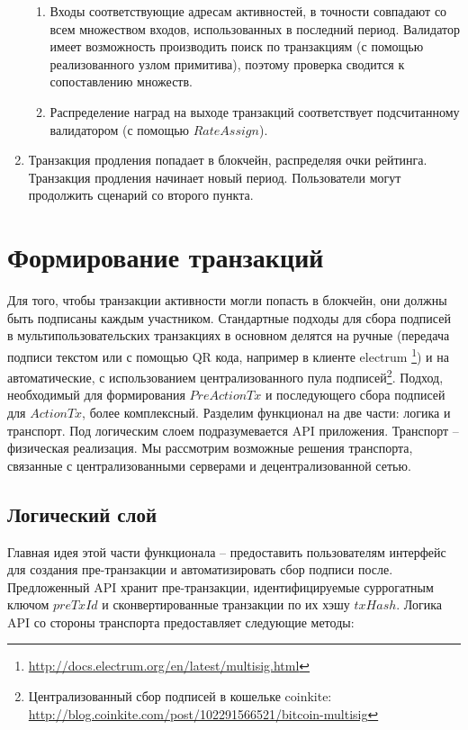 \documentclass[specification,annotation]{itmo-student-thesis}
\begin{document}
\begin{enumerate}
\begin{enumerate}
  \item Входы соответствующие адресам активностей, в точности
    совпадают со всем множеством входов, использованных в последний
    период. Валидатор имеет возможность производить поиск по
    транзакциям (с помощью реализованного узлом примитива), поэтому
    проверка сводится к сопоставлению множеств.
  \item Распределение наград на выходе транзакций соответствует
    подсчитанному валидатором (с помощью $RateAssign$).
  \end{enumerate}
\item Транзакция продления попадает в блокчейн, распределяя очки
  рейтинга. Транзакция продления начинает новый период. Пользователи
  могут продолжить сценарий со второго пункта.
\end{enumerate}

\section{Формирование транзакций}
\label{sec:txlayer}

Для того, чтобы транзакции активности могли попасть в блокчейн, они
должны быть подписаны каждым участником. Стандартные подходы для сбора
подписей в мультипользовательских транзакциях в основном делятся на
ручные (передача подписи текстом или с помощью QR кода, например в
клиенте
electrum \footnote{\url{http://docs.electrum.org/en/latest/multisig.html}})
и на автоматические, с использованием централизованного пула
подписей\footnote{Централизованный сбор подписей в кошельке coinkite:
  \url{http://blog.coinkite.com/post/102291566521/bitcoin-multisig}}. Подход,
необходимый для формирования $PreActionTx$ и последующего сбора
подписей для $ActionTx$, более комплексный. Разделим функционал на две
части: логика и транспорт. Под логическим слоем подразумевается API
приложения. Транспорт -- физическая реализация. Мы рассмотрим
возможные решения транспорта, связанные с централизованными серверами
и децентрализованной сетью.

\subsection{Логический слой}

Главная идея этой части функционала -- предоставить пользователям
интерфейс для создания пре-транзакции и автоматизировать сбор подписи
после. Предложенный API хранит пре-транзакции, идентифицируемые
суррогатным ключом $preTxId$ и сконвертированные транзакции по их
хэшу $txHash$. Логика API со стороны транспорта предоставляет
следующие методы:
\end{document}
